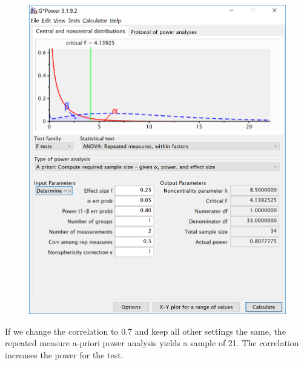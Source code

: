 \documentclass[]{article}
\begin{document}
\begin{figure}
\centering
\includegraphics{screenshots/gpower_1.png}
\caption{}
\end{figure}

If we change the correlation to 0.7 and keep all other settings the
same, the repeated measure a-priori power analysis yields a sample of
21. The correlation increases the power for the test.
\end{document}
